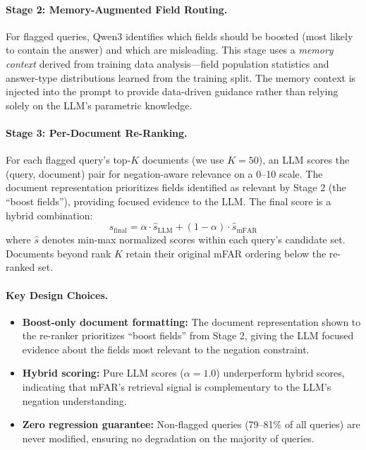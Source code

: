 \paragraph{Stage 2: Memory-Augmented Field Routing.} For flagged queries, Qwen3 identifies which fields should be boosted (most likely to contain the answer) and which are misleading. This stage uses a \emph{memory context} derived from training data analysis---field population statistics and answer-type distributions learned from the training split. The memory context is injected into the prompt to provide data-driven guidance rather than relying solely on the LLM's parametric knowledge.

\paragraph{Stage 3: Per-Document Re-Ranking.} For each flagged query's top-$K$ documents (we use $K=50$), an LLM scores the (query, document) pair for negation-aware relevance on a 0--10 scale. The document representation prioritizes fields identified as relevant by Stage 2 (the ``boost fields''), providing focused evidence to the LLM. The final score is a hybrid combination:
\begin{equation}
    s_{\text{final}} = \alpha \cdot \hat{s}_{\text{LLM}} + (1 - \alpha) \cdot \hat{s}_{\text{mFAR}}
\end{equation}
where $\hat{s}$ denotes min-max normalized scores within each query's candidate set. Documents beyond rank $K$ retain their original mFAR ordering below the re-ranked set.

\paragraph{Key Design Choices.}
\begin{itemize}
    \item \textbf{Boost-only document formatting:} The document representation shown to the re-ranker prioritizes ``boost fields'' from Stage 2, giving the LLM focused evidence about the fields most relevant to the negation constraint.
    \item \textbf{Hybrid scoring:} Pure LLM scores ($\alpha=1.0$) underperform hybrid scores, indicating that mFAR's retrieval signal is complementary to the LLM's negation understanding.
    \item \textbf{Zero regression guarantee:} Non-flagged queries (79--81\% of all queries) are never modified, ensuring no degradation on the majority of queries.
\end{itemize}

